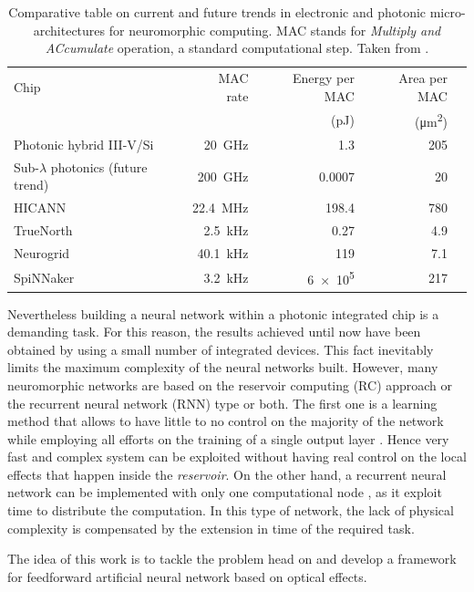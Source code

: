 \begin{table}[!htbp]
	\centering
	\footnotesize
	\begin{tabular}{l r r r r}
	\toprule
	\normalsize Chip & \normalsize MAC rate & \normalsize Energy per MAC & \normalsize Area per MAC \\
	& & (\si{\pico\joule}) & (\si{\square\um})\\
	\midrule
	Photonic hybrid III-V/Si & \SI{20}{\GHz} & \num{1.3} 	& 205 \\
	Sub-$\lambda$ photonics (future trend) & \SI{200}{\GHz} & \num{0.0007} 	& 20 \\
	HICANN & \SI{22.4}{\MHz} & \num{198.4} 	& 780 \\
	TrueNorth & \SI{2.5}{\kHz} & \num{0.27} 	& 4.9 \\
	Neurogrid & \SI{40.1}{\kHz} & \num{119} 	& 7.1 \\
	SpiNNaker & \SI{3.2}{\kHz} & \num{6e5} 	& 217 \\
	\bottomrule
	\end{tabular}
	\caption{Comparative table on current and future trends in electronic and photonic micro-architectures for neuromorphic computing. MAC stands for \textit{Multiply and ACcumulate} operation, a standard computational step. Taken from \cite{de2017progress}.}
	\label{tab:neuromorphic_arc}
\end{table}

Nevertheless building a neural network within a photonic integrated chip is a demanding task.
For this reason, the results achieved until now have been obtained by using a small number of integrated devices.
This fact inevitably limits the maximum complexity of the neural networks built.
However, many neuromorphic networks are based on the reservoir computing (RC) approach or the recurrent neural network (RNN) type or both.
The first one is a learning method that allows to have little to no control on the majority of the network while employing all efforts on the training of a single output layer \cite{van2017advances, haynes2015reservoir}.
Hence very fast and complex system can be exploited without having real control on the local effects that happen inside the \textit{reservoir}.
On the other hand, a recurrent neural network can be implemented with only one computational node \cite{dejonckheere2014all, haynes2015reservoir}, as it exploit time to distribute the computation.
In this type of network, the lack of physical complexity is compensated by the extension in time of the required task.

The idea of this work is to tackle the problem head on and develop a framework for feedforward artificial neural network based on optical effects.

